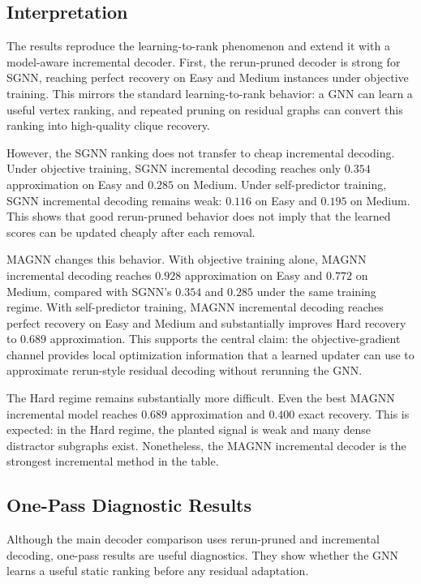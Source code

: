\subsection{Interpretation}

The results reproduce the learning-to-rank phenomenon and extend it with a model-aware incremental decoder. First, the rerun-pruned decoder is strong for SGNN, reaching perfect recovery on Easy and Medium instances under objective training. This mirrors the standard learning-to-rank behavior: a GNN can learn a useful vertex ranking, and repeated pruning on residual graphs can convert this ranking into high-quality clique recovery.

However, the SGNN ranking does not transfer to cheap incremental decoding. Under objective training, SGNN incremental decoding reaches only $0.354$ approximation on Easy and $0.285$ on Medium. Under self-predictor training, SGNN incremental decoding remains weak: $0.116$ on Easy and $0.195$ on Medium. This shows that good rerun-pruned behavior does not imply that the learned scores can be updated cheaply after each removal.

MAGNN changes this behavior. With objective training alone, MAGNN incremental decoding reaches $0.928$ approximation on Easy and $0.772$ on Medium, compared with SGNN's $0.354$ and $0.285$ under the same training regime. With self-predictor training, MAGNN incremental decoding reaches perfect recovery on Easy and Medium and substantially improves Hard recovery to $0.689$ approximation. This supports the central claim: the objective-gradient channel provides local optimization information that a learned updater can use to approximate rerun-style residual decoding without rerunning the GNN.

The Hard regime remains substantially more difficult. Even the best MAGNN incremental model reaches $0.689$ approximation and $0.400$ exact recovery. This is expected: in the Hard regime, the planted signal is weak and many dense distractor subgraphs exist. Nonetheless, the MAGNN incremental decoder is the strongest incremental method in the table.

\subsection{One-Pass Diagnostic Results}

Although the main decoder comparison uses rerun-pruned and incremental decoding, one-pass results are useful diagnostics. They show whether the GNN learns a useful static ranking before any residual adaptation.

